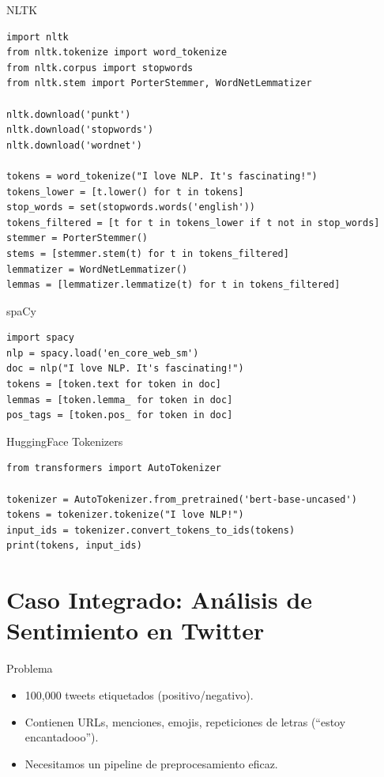 \documentclass[aspectratio=169, 10pt, xcolor=table]{beamer}
\begin{document}
\begin{frame}[fragile]{NLTK}
    \begin{lstlisting}
import nltk
from nltk.tokenize import word_tokenize
from nltk.corpus import stopwords
from nltk.stem import PorterStemmer, WordNetLemmatizer

nltk.download('punkt')
nltk.download('stopwords')
nltk.download('wordnet')

tokens = word_tokenize("I love NLP. It's fascinating!")
tokens_lower = [t.lower() for t in tokens]
stop_words = set(stopwords.words('english'))
tokens_filtered = [t for t in tokens_lower if t not in stop_words]
stemmer = PorterStemmer()
stems = [stemmer.stem(t) for t in tokens_filtered]
lemmatizer = WordNetLemmatizer()
lemmas = [lemmatizer.lemmatize(t) for t in tokens_filtered]
    \end{lstlisting}
\end{frame}

\begin{frame}[fragile]{spaCy}
    \begin{lstlisting}
import spacy
nlp = spacy.load('en_core_web_sm')
doc = nlp("I love NLP. It's fascinating!")
tokens = [token.text for token in doc]
lemmas = [token.lemma_ for token in doc]
pos_tags = [token.pos_ for token in doc]
    \end{lstlisting}
\end{frame}

\begin{frame}[fragile]{HuggingFace Tokenizers}
    \begin{lstlisting}
from transformers import AutoTokenizer

tokenizer = AutoTokenizer.from_pretrained('bert-base-uncased')
tokens = tokenizer.tokenize("I love NLP!")
input_ids = tokenizer.convert_tokens_to_ids(tokens)
print(tokens, input_ids)
    \end{lstlisting}
\end{frame}

\section{Caso Integrado: Análisis de Sentimiento en Twitter}

\begin{frame}{Problema}
    \begin{itemize}
        \item 100,000 tweets etiquetados (positivo/negativo).
        \item Contienen URLs, menciones, emojis, repeticiones de letras (``estoy encantadooo'').
        \item Necesitamos un pipeline de preprocesamiento eficaz.
    \end{itemize}
\end{frame}
\end{document}
